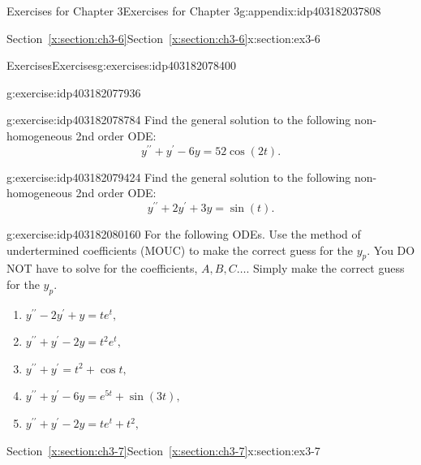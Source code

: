 \documentclass[oneside,10pt,]{book}
\newcommand{\xreffont}{\relax}
\numberwithin{equation}{section}
\numberwithin{equation}{section}
\begin{document}
\begin{appendixptx}{Exercises for Chapter 3}{}{Exercises for Chapter 3}{}{}{g:appendix:idp403182037808}
\begin{sectionptx}{Section~{\xreffont\ref*{x:section:ch3-6}}}{}{Section~{\xreffont\ref*{x:section:ch3-6}}}{}{}{x:section:ex3-6}
\begin{exercises-subsection-numberless}{Exercises}{}{Exercises}{}{}{g:exercises:idp403182078400}
\begin{divisionexercise}{4}{}{}{g:exercise:idp403182077936}
%
\end{divisionexercise}%
\begin{divisionexercise}{5}{}{}{g:exercise:idp403182078784}%
Find the general solution to the following non-homogeneous 2nd order ODE:%
\begin{equation*}
y^{\prime\prime}+y^{\prime}-6y=52\cos\left(2t\right).
\end{equation*}
%
\end{divisionexercise}%
\begin{divisionexercise}{6}{}{}{g:exercise:idp403182079424}%
Find the general solution to the following non-homogeneous 2nd order ODE:%
\begin{equation*}
y^{\prime\prime}+2y^{\prime}+3y=\sin\left(t\right).
\end{equation*}
%
\end{divisionexercise}%
\begin{divisionexercise}{7}{}{}{g:exercise:idp403182080160}%
For the following ODEs. Use the method of undertermined coefficients (MOUC) to make the correct guess for the \(y_{p}\). You DO NOT have to solve for the coefficients, \(A,B,C\dots\). Simply make the correct guess for the \(y_{p}\).%
\begin{enumerate}[label=(\alph*)]
\item{}\(\displaystyle y^{\prime\prime}-2y^{\prime}+y=te^{t},\)%
\item{}\(\displaystyle y^{\prime\prime}+y^{\prime}-2y=t^{2}e^{t},\)%
\item{}\(\displaystyle y^{\prime\prime}+y^{\prime}=t^{2}+\cos t,\)%
\item{}\(\displaystyle y^{\prime\prime}+y^{\prime}-6y=e^{5t}+\sin(3t),\)%
\item{}\(\displaystyle y^{\prime\prime}+y^{\prime}-2y=te^{t}+t^{2},\)%
\end{enumerate}
%
\end{divisionexercise}%
\end{exercises-subsection-numberless}
\end{sectionptx}
%
%
\typeout{************************************************}
\typeout{Section D.6 Section~{\xreffont\ref*{x:section:ch3-7}}}
\typeout{************************************************}
%
\begin{sectionptx}{Section~{\xreffont\ref*{x:section:ch3-7}}}{}{Section~{\xreffont\ref*{x:section:ch3-7}}}{}{}{x:section:ex3-7}
%
%
\typeout{************************************************}
\typeout{************************************************}

\end{sectionptx}
\end{appendixptx}
\end{document}
